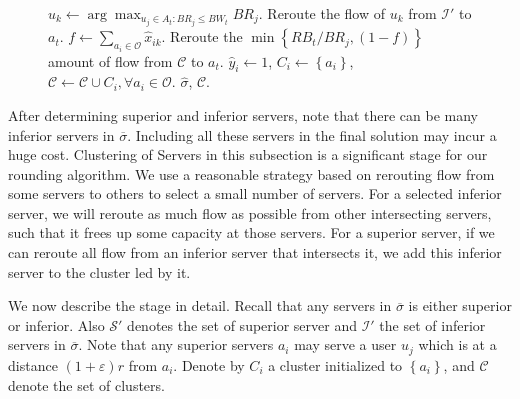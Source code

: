 \documentclass[journal]{IEEEtran}
\begin{document}
\begin{figure}[!t]
\begin{algorithm}[H]
\begin{algorithmic}[1]
			\ENDWHILE
			\ENDIF
			\STATE $u_k \leftarrow \arg\max_{u_j \in A_t : BR_j \le BW_t}BR_j$.
			\STATE Reroute the flow of $u_k$ from $\mathcal{I}'$ to $a_t$.
			\STATE $f \leftarrow \sum\nolimits_{{a_i} \in \mathcal{O}} {{{\widehat x}_{ik}}} $.
			\STATE Reroute the $\min \left\{RB_t/BR_j, (1-f)\right\}$ amount of flow from $\mathcal{C}$ to $a_t$.
			\ENDIF
			\ENDIF
			\ENDWHILE
			\STATE $\widehat y_i \leftarrow 1$, $ C_i \leftarrow \left\{a_i\right\} $, $\mathcal{C} \leftarrow \mathcal{C} \cup C_i , \forall a_i \in \mathcal{O}$. 
			\RETURN $\widehat{\sigma}$, $\mathcal{C}$.
		\end{algorithmic}
	\end{algorithm}
\end{figure}
After determining superior and inferior servers, note that there can be many inferior servers in $\overline{\sigma}$.  Including all these servers in the final solution may incur a huge cost. Clustering of Servers in this subsection is a significant stage for our rounding algorithm. We use a reasonable strategy based on rerouting flow from some servers to others to select a small number of servers. For a selected inferior server, we will reroute as much flow as possible from other intersecting servers, such that it frees up some capacity at those servers. For a superior server, if we can reroute all flow from an inferior server that intersects it, we add this inferior server to the cluster led by it. 


We now describe the stage in detail. Recall that any servers in $\overline{\sigma}$ is either superior or inferior. Also $\mathcal{S}'$ denotes the set of superior server and $\mathcal{I}'$ the set of inferior servers in $\overline{\sigma}$. Note that any superior servers $a_i$ may serve a user $u_j$ which is at a distance $(1+\varepsilon)r$ from $a_i$. Denote by $C_i$ a cluster initialized to $\left\{a_i\right\}$, and $\mathcal{C}$ denote the set of clusters.
\end{document}
